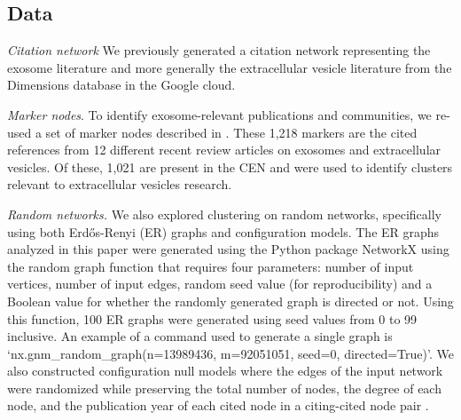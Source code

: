 \documentclass[12pt, oneside]{article}   	%
\begin{document}
\subsection{Data} 

\emph{Citation network} We previously generated a citation network \citep{Wedell2022} representing the exosome literature and more generally the extracellular vesicle literature \citep{harding1983,raposo2021} from the Dimensions database \citep{hook2018dimensions} in the Google cloud. 
	
\emph{Marker nodes}. To identify exosome-relevant publications and communities, we re-used a set of marker nodes described in  \cite{Wedell2022}. These 1,218 markers are the cited references from 12 different recent review articles on exosomes and extracellular vesicles. Of these, 1,021 are present in the CEN and  were used to identify clusters relevant to extracellular vesicles research.


\emph{Random networks.}
We also explored clustering on random networks, specifically using both Erd\H{o}s-Renyi (ER) graphs and configuration models.  The
ER graphs  analyzed in this paper were generated using the Python package NetworkX \citep{hagberg2008} using the random graph function that requires four parameters: number of input vertices, number of input edges, random seed value (for reproducibility) and a Boolean value for whether the randomly generated graph is directed or not. Using this function, 100 ER graphs were generated using seed values from 0 to 99 inclusive. An example of a command used to generate a single graph is  `nx.gnm\_random\_graph(n=13989436, m=92051051, seed=0, directed=True)'. 
We also constructed configuration null models where the edges of the input network were randomized while preserving the total number of nodes, the degree of each node,  and the publication year of each cited node in a citing-cited node pair \citep{bradley2020}. 
 
\end{document}
